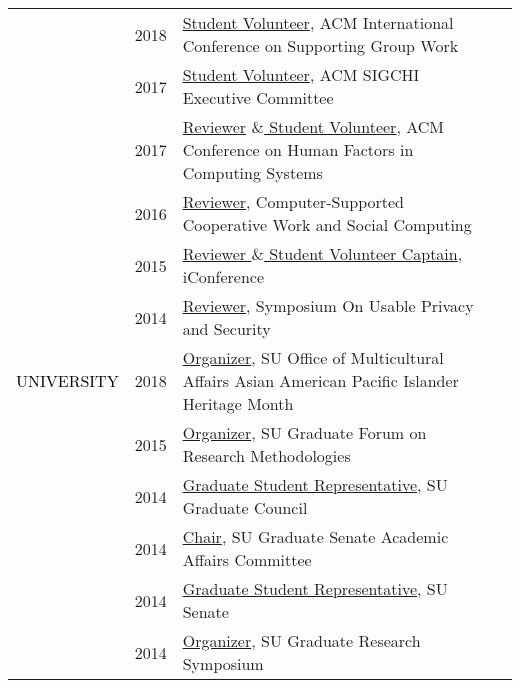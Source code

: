 \documentclass[12pt]{article}
\begin{document}
{{\begin{longtable}{Rp{1.0in}p{0.25in}p{4.75in}}
& \footnotesize{2018} & \href{http://group.acm.org/conferences/group18/index.html}{{Student Volunteer}}, ACM International Conference on Supporting Group Work \\

& \footnotesize{2017} & \href{https://sigchi.org/}{{Student Volunteer}}, ACM SIGCHI Executive Committee \\

& \footnotesize{2017} & \href{https://chi2017.acm.org/}{{Reviewer}} \href{http://ischools.org/the-iconference/}{{$\&$  Student Volunteer}}, ACM Conference on Human Factors in Computing Systems \\

& \footnotesize{2016} & \href{https://cscw.acm.org/}{{Reviewer}}, Computer-Supported Cooperative Work and Social Computing \\

& \footnotesize{2015} & \href{http://ischools.org/the-iconference/}{{Reviewer $\&$  Student Volunteer Captain}}, iConference \\

& \footnotesize{2014} & \href{https://www.usenix.org/sites/default/files/soups14_proceedings.pdf}{{Reviewer}}, Symposium On Usable Privacy and Security \\

\textcolor{black}{\footnotesize{\uppercase{University}}} & \footnotesize{2018} & \href{http://dailyorange.com/2018/04/asian-american-pacific-islander-students-celebrate-place-syracuse-university/}{{Organizer}}, SU Office of Multicultural Affairs Asian American Pacific Islander Heritage Month \\

& \footnotesize{2015} & \href{http://gradresearch.syr.edu}{{Organizer}}, SU Graduate Forum on Research Methodologies \\

& \footnotesize{2014} & \href{http://gradorg.syr.edu/senate/committees/}{{Graduate Student Representative}}, SU Graduate Council \\

& \footnotesize{2014} & \href{http://gradorg.syr.edu/senate/committees/}{{Chair}}, SU Graduate Senate Academic Affairs Committee \\

& \footnotesize{2014} & \href{http://universitysenate.syr.edu/}{{Graduate Student Representative}}, SU Senate \\

& \footnotesize{2014} & \href{https://www.facebook.com/sugrads/photos/tab=album\&album\_id=874022975972914}{{Organizer}}, SU Graduate Research Symposium \\


\end{longtable}}}
\end{document}
